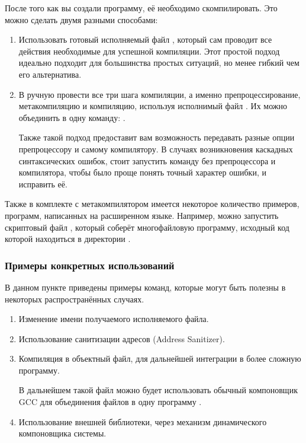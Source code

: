 После того как вы создали программу, её необходимо скомпилировать. Это можно сделать двумя разными способами:
\begin{enumerate}
  \item Использовать готовый исполняемый файл , который сам проводит все действия необходимые для успешной компиляции.
  Этот простой подход идеально подходит для большинства простых ситуаций, но менее гибкий чем его альтернатива.

  \item В ручную провести все три шага компиляции, а именно препроцессирование, метакомпиляцию и компиляцию, используя исполнимый файл . Их можно объединить в одну команду: .

  Также такой подход предоставит вам возможность передавать разные опции препроцессору и самому компилятору.
  В случаях возникновения каскадных синтаксических ошибок, стоит запустить команду  без препроцессора и компилятора, чтобы было проще понять точный характер ошибки, и исправить её.
\end{enumerate}

Также в комплекте с метакомпилятором имеется некоторое количество примеров, программ, написанных на расширенном языке.
Например, можно запустить скриптовый файл , который соберёт многофайловую программу, исходный код которой находиться в директории  .

\subsubsection{Примеры конкретных использований}
В данном пункте приведены примеры команд, которые могут быть полезны в некоторых распространённых случаях.
\begin{enumerate}
  \item Изменение имени получаемого исполняемого файла.

  {\centering{}}

  \item Использование санитизации адресов (Address Sanitizer).

  {\centering{}}

  \item Компиляция в объектный файл, для дальнейшей интеграции в более сложную программу.

  {\centering{}}

  В дальнейшем такой файл можно будет использовать обычный компоновщик GCC для объединения файлов в одну программу .

  \item Использование внешней библиотеки, через механизм динамического компоновщика системы.

  {\centering{}}

\end{enumerate}

